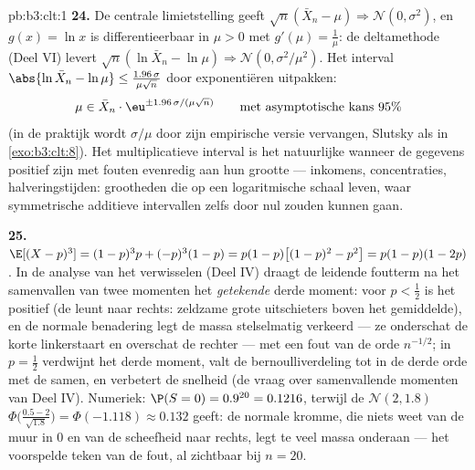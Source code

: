 \begin{solution}{pb:b3:clt:1}
\textbf{24.} De centrale limietstelling geeft $\sqrt n(\bar
X_n - \mu) \Rightarrow \mathcal N(0, \sigma^2)$, en $g(x) =
\ln x$ is differentieerbaar in $\mu > 0$ met $g'(\mu) =
\frac1\mu$: de deltamethode (Deel VI) levert $\sqrt n(\ln\bar
X_n - \ln\mu) \Rightarrow \mathcal N(0, \sigma^2/\mu^2)$.
Het interval $\abs{\ln\bar X_n - \ln\mu} \leq
\frac{1.96\,\sigma}{\mu\sqrt n}$ door exponentiëren
uitpakken:
\[
\mu \in \bar X_n\cdot
\eu^{\pm1.96\,\sigma/(\mu\sqrt n)}
\qquad\text{met asymptotische kans } 95\%
\]
(in de praktijk wordt $\sigma/\mu$ door zijn empirische
versie vervangen, Slutsky als in \cref{exo:b3:clt:8}). Het
multiplicatieve interval is het natuurlijke wanneer de
gegevens positief zijn met fouten evenredig aan hun grootte
--- inkomens, concentraties, halveringstijden: grootheden
die op een logaritmische schaal leven, waar symmetrische
additieve intervallen zelfs door nul zouden kunnen gaan.

\textbf{25.} $\E[(X - p)^3] = (1-p)^3p + (-p)^3(1 - p) =
p(1-p)\bigl[(1-p)^2 - p^2\bigr] = p(1-p)(1 - 2p)$. In de
analyse van het verwisselen (Deel IV) draagt de leidende
foutterm na het samenvallen van twee momenten het
\emph{getekende} derde moment: voor $p < \frac12$ is het
positief (de  leunt naar rechts: zeldzame grote
uitschieters boven het gemiddelde), en de normale benadering
legt de massa stelselmatig verkeerd --- ze onderschat de
korte linkerstaart en overschat de rechter --- met een fout
van de orde $n^{-1/2}$; in $p = \frac12$ verdwijnt het derde
moment, valt de bernoulliverdeling tot in de derde orde met
de  samen, en verbetert de snelheid (de vraag over
samenvallende momenten van Deel IV). Numeriek: $\P(S = 0) =
0.9^{20} = 0.1216$, terwijl de  $\mathcal N(2,
1.8)$ $\Phi\bigl(\frac{0.5 - 2}{\sqrt{1.8}}\bigr) =
\Phi(-1.118) \approx 0.132$ geeft: de normale kromme, die
niets weet van de muur in $0$ en van de scheefheid naar
rechts, legt te veel massa onderaan --- het voorspelde teken
van de fout, al zichtbaar bij $n = 20$.
\end{solution}
